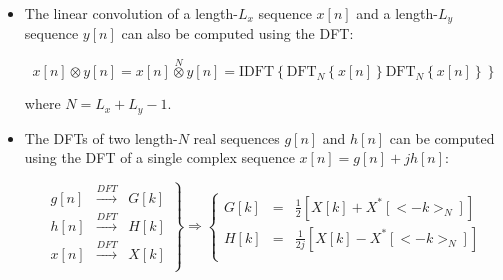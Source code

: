 \documentclass[a4paper,11pt,oneside]{article}
\begin{document}
\begin{itemize}
\item The linear convolution of a length-$L_{x}$ sequence $x[n]$ and a length-$L_y$ sequence $y[n]$ can also be computed using the DFT:

\[
x[n]\otimes y[n]=x[n]\stackrel{N}{\otimes}y[n]=\textrm{IDFT}\left\{\textrm{DFT}_{N}\left\{x[n]\right\}\textrm{DFT}_{N}\left\{x[n]\right\}\right\}
\]

where $N=L_x+L_y-1$.

\item The DFTs of two length-$N$ real sequences $g[n]$ and $h[n]$ can be computed using the DFT of a single complex sequence $x[n]=g[n]+jh[n]$:

\[
\left.
\begin{array}{lll}
g[n]&\stackrel{DFT}{\rightarrow}&G[k]\\
h[n]&\stackrel{DFT}{\rightarrow}&H[k]\\
x[n]&\stackrel{DFT}{\rightarrow}&X[k]\\
\end{array}
\right\}
\Longrightarrow 
\left\{
\begin{array}{lll}
G[k] &=& \frac{1}{2}\left[X[k]+X^*[<-k>_{N}]\right]\\
H[k] &=& \frac{1}{2j}\left[X[k]-X^*[<-k>_{N}]\right]\\
\end{array}
\right.
\]


\end{itemize}




\end{document}
